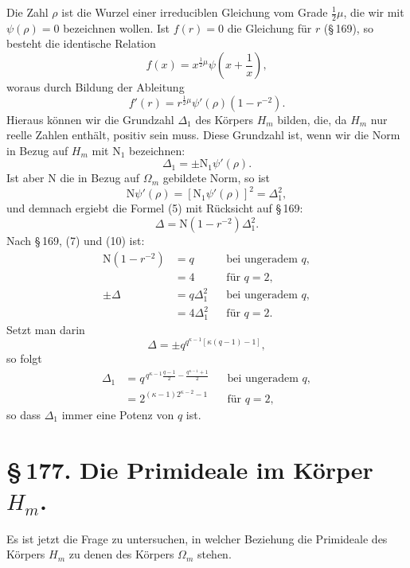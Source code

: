 \documentclass[11pt]{article}
\newcommand{\Norm}{\mathrm{N}}
\newcommand{\Normone}{\mathrm{N}_1}
\begin{document}
Die Zahl $\rho$ ist die Wurzel einer irreduciblen Gleichung vom Grade $\frac12\mu$, die wir mit $\psi(\rho)=0$ bezeichnen wollen. Ist $f(r)=0$ die Gleichung für $r$ (\S\,169), so besteht die identische Relation
\begin{equation}
f(x)=x^{\frac12\mu}\psi\left(x+\frac1x\right),
\tag{4}
\end{equation}
woraus durch Bildung der Ableitung
\begin{equation}
f'(r)=r^{\frac12\mu}\psi'(\rho)(1-r^{-2}).
\tag{5}
\end{equation}
Hieraus können wir die Grundzahl $\Delta_1$ des Körpers $H_m$ bilden, die, da $H_m$ nur reelle Zahlen enthält, positiv sein muss. Diese Grundzahl ist, wenn wir die Norm in Bezug auf $H_m$ mit $\Normone$ bezeichnen:
\[
\Delta_1=\pm\Normone\psi'(\rho).
\]
Ist aber $\Norm$ die in Bezug auf $\Omega_m$ gebildete Norm, so ist
\[
\Norm\psi'(\rho)=[\Normone\psi'(\rho)]^2=\Delta_1^2,
\]
und demnach ergiebt die Formel (5) mit Rücksicht auf \S\,169:
\[
\Delta=\Norm(1-r^{-2})\Delta_1^2.
\]
Nach \S\,169, (7) und (10) ist:
\begin{equation}
\begin{aligned}
\Norm(1-r^{-2})&=q &&\text{bei ungeradem }q,\\
&=4 &&\text{für }q=2,\\
\pm\Delta&=q\Delta_1^2 &&\text{bei ungeradem }q,\\
&=4\Delta_1^2 &&\text{für }q=2.
\end{aligned}
\tag{6}
\end{equation}
Setzt man darin
\[
\Delta=\pm q^{q^{\kappa-1}[\kappa(q-1)-1]},
\]
so folgt
\begin{equation}
\begin{aligned}
\Delta_1&=q^{\,q^{\kappa-1}\frac{q-1}{2}-\frac{q^{\kappa-1}+1}{2}} &&\text{bei ungeradem }q,\\
&=2^{(\kappa-1)2^{\kappa-2}-1} &&\text{für }q=2,
\end{aligned}
\tag{7}
\end{equation}
so dass $\Delta_1$ immer eine Potenz von $q$ ist.

\section*{\S\,177. Die Primideale im Körper $H_m$.}

Es ist jetzt die Frage zu untersuchen, in welcher Beziehung die Primideale des Körpers $H_m$ zu denen des Körpers $\Omega_m$ stehen.
\end{document}
